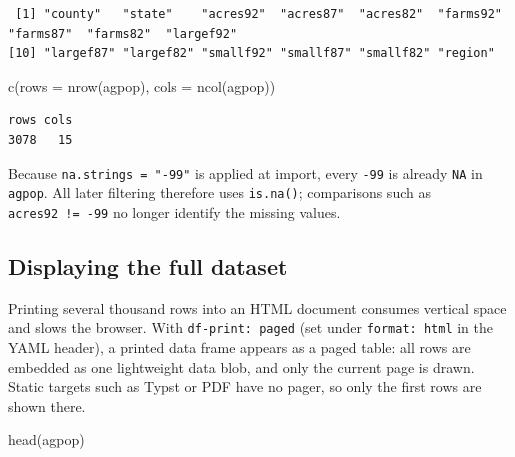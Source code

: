 \documentclass[
  letterpaper,
  DIV=11,
  numbers=noendperiod]{scrreprt}
\newenvironment{Shaded}{\begin{snugshade}}{\end{snugshade}}
\newcommand{\AttributeTok}[1]{\textcolor[rgb]{0.40,0.45,0.13}{#1}}
\newcommand{\FunctionTok}[1]{\textcolor[rgb]{0.28,0.35,0.67}{#1}}
\newcommand{\NormalTok}[1]{\textcolor[rgb]{0.00,0.23,0.31}{#1}}
\renewcommand{\[}{\begin{equation}}
\renewcommand{\]}{\end{equation}}
\begin{document}
\begin{verbatim}
 [1] "county"   "state"    "acres92"  "acres87"  "acres82"  "farms92"  "farms87"  "farms82"  "largef92"
[10] "largef87" "largef82" "smallf92" "smallf87" "smallf82" "region"  
\end{verbatim}

\begin{Shaded}
\begin{Highlighting}[]
\FunctionTok{c}\NormalTok{(}\AttributeTok{rows =} \FunctionTok{nrow}\NormalTok{(agpop), }\AttributeTok{cols =} \FunctionTok{ncol}\NormalTok{(agpop))}
\end{Highlighting}
\end{Shaded}

\begin{verbatim}
rows cols 
3078   15 
\end{verbatim}

Because \texttt{na.strings\ =\ "-99"} is applied at import, every
\texttt{-99} is already \texttt{NA} in \texttt{agpop}. All later
filtering therefore uses \texttt{is.na()}; comparisons such as
\texttt{acres92\ !=\ -99} no longer identify the missing values.

\subsection{Displaying the full
dataset}\label{displaying-the-full-dataset}

Printing several thousand rows into an HTML document consumes vertical
space and slows the browser. With \texttt{df-print:\ paged} (set under
\texttt{format:\ html} in the YAML header), a printed data frame appears
as a paged table: all rows are embedded as one lightweight data blob,
and only the current page is drawn. Static targets such as Typst or PDF
have no pager, so only the first rows are shown there.

\begin{Shaded}
\begin{Highlighting}[]
\FunctionTok{head}\NormalTok{(agpop)}
\end{Highlighting}
\end{Shaded}
\end{document}

